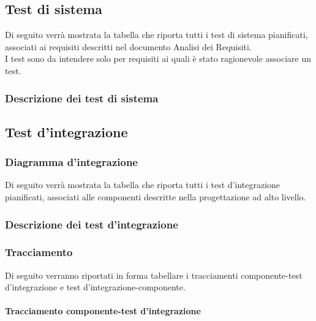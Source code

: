 \subsection{Test di sistema}
Di seguito verrà mostrata la tabella che riporta tutti i test di sistema pianificati, associati ai requisiti descritti nel documento Analisi dei Requisiti.\\
I test sono da intendere solo per requisiti ai quali è stato ragionevole associare un test.

\subsubsection{Descrizione dei test di sistema}


\subsection{Test d'integrazione}

\subsubsection{Diagramma d'integrazione}
Di seguito verrà mostrata la tabella che riporta tutti i test d'integrazione pianificati, associati alle componenti descritte nella progettazione ad alto livello.\\

\subsubsection{Descrizione dei test d'integrazione}


\subsubsection{Tracciamento}
Di seguito verranno riportati in forma tabellare i tracciamenti componente-test d'integrazione e test d'integrazione-componente.\\

\paragraph{Tracciamento componente-test d'integrazione}


